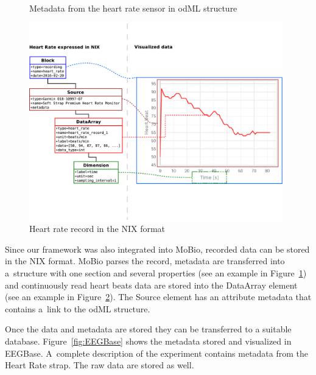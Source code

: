 \documentclass[a4paper,twoside]{article}
\begin{document}
\begin{figure}

\caption{\label{odML}Metadata from the heart rate sensor in odML structure}
\end{figure}


\begin{figure}
\centering\includegraphics[width=11cm]{NIX-example.png}
\caption{\label{NIX-ex}Heart rate record in the NIX format}
\end{figure}


Since our framework was also integrated into MoBio, recorded data can be stored in the NIX format. MoBio parses the record, metadata are transferred into a~structure with one section and several properties (see an example in Figure~\ref{odML}) and continuously read heart beats data are stored into the DataArray element (see an example in Figure~\ref{NIX-ex}). The Source element has an attribute metadata that contains a~link to the odML structure.




Once the data and metadata are stored they can be transferred to a suitable database. Figure~\ref{fig:EEGBase} shows the metadata stored and visualized in EEGBase. A~complete description of the experiment contains metadata from the Heart Rate strap. The raw data are stored as well.
\end{document}
